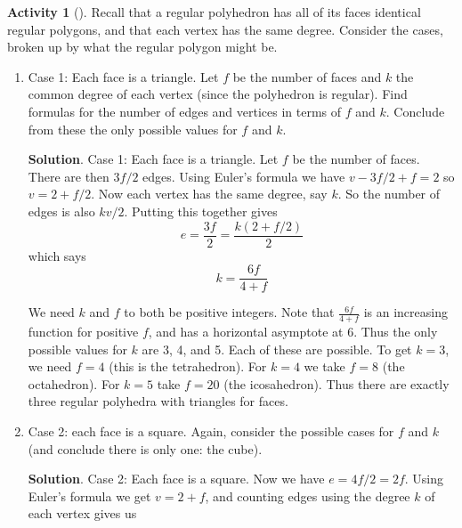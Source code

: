 \documentclass[10pt,]{book}
\theoremstyle{plain}
\theoremstyle{definition}
\theoremstyle{definition}
\theoremstyle{definition}
\newtheorem{activity}[project]{Activity}
\numberwithin{equation}{chapter}
\begin{document}
\begin{activity}[]\label{activity-30}
\hypertarget{p-319}{}%
Recall that a regular polyhedron has all of its faces identical regular polygons, and that each vertex has the same degree. Consider the cases, broken up by what the regular polygon might be.%
\begin{enumerate}[font=\bfseries,label=(\alph*),ref=\alph*]
\item\label{task-44} \hypertarget{p-320}{}%
Case 1: Each face is a triangle.  Let \(f\) be the number of faces and \(k\) the common degree of each vertex (since the polyhedron is regular).  Find formulas for the number of edges and vertices in terms of \(f\) and \(k\).  Conclude from these the only possible values for \(f\) and \(k\).%
\par\smallskip%
\noindent\textbf{Solution}.\hypertarget{solution-21}{}\quad%
\hypertarget{p-321}{}%
Case 1: Each face is a triangle. Let \(f\) be the number of faces. There are then \(3f/2\) edges. Using Euler's formula we have \(v - 3f/2 + f = 2\) so \(v = 2 + f/2\). Now each vertex has the same degree, say \(k\). So the number of edges is also \(kv/2\). Putting this together gives%
\begin{equation*}
e = \frac{3f}{2} = \frac{k(2+f/2)}{2}
\end{equation*}
which says%
\begin{equation*}
k = \frac{6f}{4+f}
\end{equation*}
%
\par
\hypertarget{p-322}{}%
We need \(k\) and \(f\) to both be positive integers. Note that \(\frac{6f}{4+f}\) is an increasing function for positive \(f\), and has a horizontal asymptote at 6. Thus the only possible values for \(k\) are 3, 4, and 5. Each of these are possible. To get \(k = 3\), we need \(f = 4\) (this is the tetrahedron). For \(k = 4\) we take \(f = 8\) (the octahedron). For \(k = 5\) take \(f = 20\) (the icosahedron). Thus there are exactly three regular polyhedra with triangles for faces.%
\item\label{task-45} \hypertarget{p-323}{}%
Case 2: each face is a square.  Again, consider the possible cases for \(f\) and \(k\) (and conclude there is only one: the cube).%
\par\smallskip%
\noindent\textbf{Solution}.\hypertarget{solution-22}{}\quad%
\hypertarget{p-324}{}%
Case 2: Each face is a square. Now we have \(e = 4f/2 = 2f\). Using Euler's formula we get \(v = 2 + f\), and counting edges using the degree \(k\) of each vertex gives us%

\end{enumerate}
\end{activity}
\end{document}

